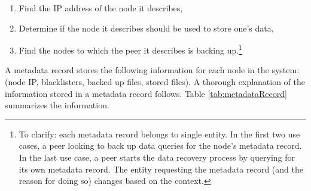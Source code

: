\documentclass[12pt]{report}
\begin{document}
\begin{enumerate}
  \item Find the IP address of the node it describes,
  \item Determine if the node it describes should be used to store one's data,
  \item Find the nodes to which the peer it describes is backing up.\footnote{To clarify: each metadata record belongs to single entity. In the first two use cases, a peer looking to back up data queries for the node's metadata record. In the last use case, a peer starts the data recovery process by querying for its own metadata record. The entity requesting the metadata record (and the reason for doing so) changes based on the context.}
\end{enumerate}

A metadata record stores the following information for each node in the system: (node IP, blacklisters, backed up files, stored files). A thorough explanation of the information stored in a metadata record follows. Table \ref{tab:metadataRecord} summarizes the information.
\end{document}
